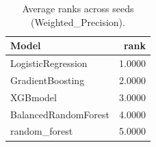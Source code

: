 \begin{table}[t]
\centering
\begin{tabular}{lr}
\toprule
Model & rank \\
\midrule
LogisticRegression & 1.0000 \\
GradientBoosting & 2.0000 \\
XGBmodel & 3.0000 \\
BalancedRandomForest & 4.0000 \\
random_forest & 5.0000 \\
\bottomrule
\end{tabular}
\caption{Average ranks across seeds (Weighted_Precision).}
\label{tab:avg_rank_Weighted_Precision}
\end{table}